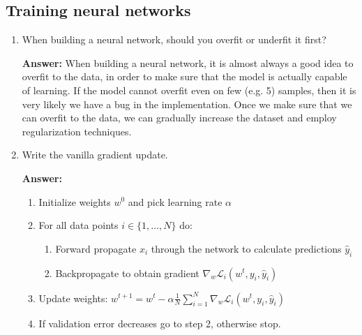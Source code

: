 \documentclass{article}
\newenvironment{QandA}{\begin{enumerate}[label=\arabic*.]}{\end{enumerate}}
\newenvironment{answer}{\par\normalfont \textbf{Answer:}}{}
\begin{document}
\subsection{Training neural networks}
\begin{QandA}
    \item When building a neural network, should you overfit or underfit it first?
    \begin{answer}
        When building a neural network, it is almost always a good idea to overfit to the data, in order to make sure that the model is actually capable of learning. If the model cannot overfit even on few (e.g. 5) samples, then it is very likely we have a bug in the implementation. Once we make sure that we can overfit to the data, we can gradually increase the dataset and employ regularization techniques. 
    \end{answer}

    \item Write the vanilla gradient update.
    \begin{answer}
        \begin{enumerate}[label=\arabic*.]
            \item Initialize weights $w^0$ and pick learning rate $\alpha$
            \item For all data points $i \in \{1, \ldots, N\}$ do:
            \begin{enumerate}[label=2.\arabic*.]
                \item Forward propagate $x_i$ through the network to calculate predictions $\hat{y}_i$
                \item Backpropagate to obtain gradient $\nabla_w \mathcal{L}_i (w^t, y_i, \hat{y}_i)$
            \end{enumerate}
            \item Update weights: $w^{t+1} = w^t - \alpha \frac{1}{N}\sum_{i=1}^N \nabla_w \mathcal{L}_i(w^t, y_i, \hat{y}_i)$
            \item If validation error decreases go to step 2, otherwise stop.
        \end{enumerate}
    \end{answer}


\end{QandA}
\end{document}
